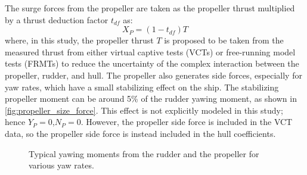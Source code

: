 \noindent The surge forces from the propeller are taken as the propeller thrust multiplied by a thrust deduction factor $t_{df}$ as:
\begin{equation}
    \label{eq:X_P}
    X_P = (1-t_{df})T
\end{equation}
where, in this study, the propeller thrust $T$ is proposed to be taken from the measured thrust from either virtual captive tests (VCTs) or free-running model tests (FRMTs) to reduce the uncertainty of the complex interaction between the propeller, rudder, and hull. The propeller also generates side forces, especially for yaw rates, which have a small stabilizing effect on the ship. The stabilizing propeller moment can be around 5\% of the rudder yawing moment, as shown in \autoref{fig:propeller_size_force}.
This effect is not explicitly modeled in this study; hence $Y_P=0$,$N_P=0$. However, the propeller side force is included in the VCT data, so the propeller side force is instead included in the hull coefficients.

\begin{figure}[h!]
    \centering   
    
    \caption{Typical yawing moments from the rudder and the propeller for various yaw rates.}
    \label{fig:propeller_size_force}
\end{figure}